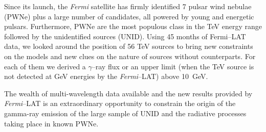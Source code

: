 Since its launch, the \emph{Fermi} satellite has firmly identified 7 pulsar wind nebulae (PWNe) plus a large number of candidates, all powered by young and energetic pulsars. Furthermore, PWNe are the most populous class in the TeV energy range followed by the unidentified sources (UNID). Using 45 months of Fermi--LAT data, we looked around the position of 56 TeV sources to bring new constraints on the models and new clues on the nature of sources without counterparts. For each of them we derived a $\gamma$--ray flux or an upper limit (when the TeV source is not detected at GeV energies by the \emph{Fermi}--LAT) above 10~GeV.

The wealth of multi-wavelength data available and the new results provided by \emph{Fermi}--LAT is an extraordinary opportunity to constrain the origin of the gamma-ray emission of the large sample of UNID and the radiative processes taking place in known PWNe. 